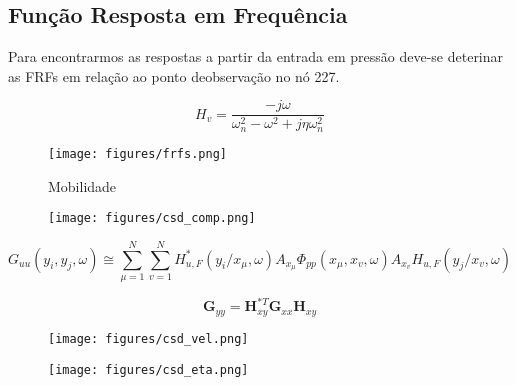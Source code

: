 \documentclass[9pt,a4paper,twoside]{rho-class/rho}
\begin{document}
\subsection{Função Resposta em Frequência}
Para encontrarmos as respostas a partir da entrada em pressão  deve-se deterinar as FRFs em relação ao ponto deobservação no nó 227.

\begin{equation}
	H_v = \frac{-j\omega}{\omega_n^2-\omega^2+j\eta\omega_n^2}
\end{equation}
\begin{figure}[H]
	\centering
	\texttt{[image: figures/frfs.png]}
	\caption{Mobilidade}
	\label{fig:frf}
\end{figure}

\begin{figure}[H]
	\centering
	\texttt{[image: figures/csd\_comp.png]}
	\caption{}
	\label{fig:comp}
\end{figure}



\begin{equation}
	G_{uu}(y_i,y_j,\omega)\cong\sum_{\mu=1}^N\sum_{v=1}^NH_{u,F}^*(y_i/x_\mu,\omega)A_{x_\mu}\Phi_{pp}(x_\mu,x_v,\omega)A_{x_v}H_{u,F}(y_j/x_v,\omega)
\end{equation}

\begin{equation}
	\mathbf{G}_{yy}=\mathbf{H}_{xy}^{*T}\mathbf{G}_{xx}\mathbf{H}_{xy}
\end{equation}


\begin{figure}[H]
	\centering
	\texttt{[image: figures/csd\_vel.png]}
	\caption{}
	\label{fig:csdvel}
\end{figure}

\begin{figure}[H]
	\centering
	\texttt{[image: figures/csd\_eta.png]}
	\caption{}
	\label{fig:csdeta}
\end{figure}



\printbibliography

\end{document}
